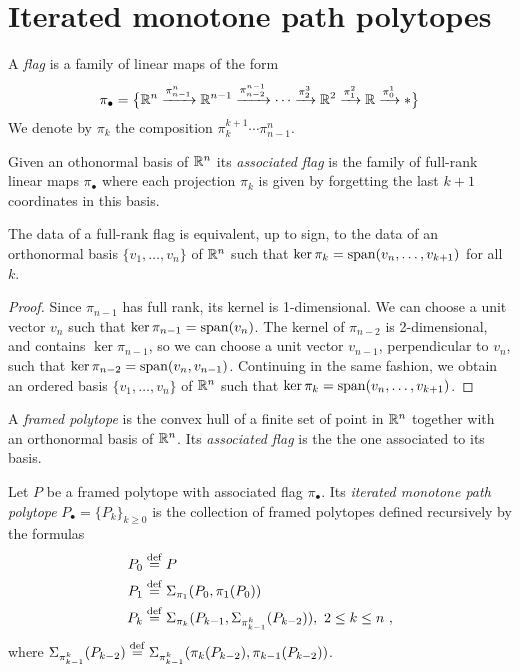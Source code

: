 
\section{Iterated monotone path polytopes}


\begin{definition}
	A \emph{flag} is a family of linear maps of the form
	\[
	\pi_\bullet = \big\{
	\mathbb{R}^n \xrightarrow{\pi^n_{n-1}} \mathbb{R}^{n-1} \xrightarrow{\pi^{n-1}_{n-2}} \dotsb \xrightarrow{\pi^3_{2}} \mathbb{R}^2 \xrightarrow{\pi^2_1} \mathbb{R} \xrightarrow{\pi^1_0} *
	\big\}
	\]
	We denote by $\pi_k$ the composition $\pi^{k+1}_{k}\cdots\pi^n_{n-1}$.
\end{definition}

Given an othonormal basis of $\mathbb{R}^n$ its \emph{associated flag} is the family of full-rank linear maps $\pi_\bullet$ where each projection $\pi_k$ is given by forgetting the last $k+1$ coordinates in this basis. 

\begin{lemma}
	The data of a full-rank flag is equivalent, up to sign, to the data of an orthonormal basis $\{v_1,\ldots,v_n\}$ of $\mathbb{R}^n$ such that $\ker \pi_k=\operatorname{\mathrm{span}}(v_n, \ldots, v_{k+1})$ for all $k$.
\end{lemma}

\begin{proof}
	Since $\pi_{n-1}$ has full rank, its kernel is 1-dimensional.
	We can choose a unit vector $v_n$ such that $\ker \pi_{n-1} = \operatorname{\mathrm{span}}(v_n)$.
	The kernel of $\pi_{n-2}$ is 2-dimensional, and contains $\ker \pi_{n-1}$, so we can choose a unit vector $v_{n-1}$, perpendicular to $v_n$, such that $\ker \pi_{n-2}=\operatorname{\mathrm{span}}(v_n,v_{n-1})$.
	Continuing in the same fashion, we obtain an ordered basis $\{v_1,\ldots, v_n\}$ of $\mathbb{R}^n$ such that $\ker \pi_{k}=\operatorname{\mathrm{span}}(v_n,\ldots,v_{k+1})$.
\end{proof}

\begin{definition}
	A \textit{framed polytope} is the convex hull of a finite set of point in $\mathbb{R}^n$ together with an orthonormal basis of $\mathbb{R}^n$.
	Its \textit{associated flag} is the the one associated to its basis.
\end{definition}

\begin{definition}
	Let $P$ be a framed polytope with associated flag $\pi_\bullet$.
	Its \textit{iterated monotone path polytope} $P_\bullet = \{P_k\}_{k \geq 0}$ is the collection of framed polytopes defined recursively by the formulas
	\begin{align*}
		P_0 & \stackrel{\mathrm{def}}{=} P \\
		P_1 & \stackrel{\mathrm{def}}{=} \Sigma_{\pi_1}(P_0,\pi_1(P_0)) \\
		P_k & \stackrel{\mathrm{def}}{=} \Sigma_{\pi_k}(P_{k-1},\Sigma_{\pi^{k}_{k-1}}(P_{k-2})), \ 2 \leq k \leq n \ ,
	\end{align*}
	where $\Sigma_{\pi^{k}_{k-1}}(P_{k-2})\stackrel{\mathrm{def}}{=} \Sigma_{\pi^{k}_{k-1}}(\pi_k(P_{k-2}),\pi_{k-1}(P_{k-2}))$.
\end{definition}

